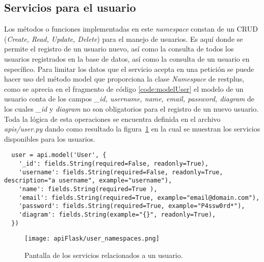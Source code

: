 \subsection{Servicios para el usuario}

Los métodos o funciones implementadas en este \textit{namespace} constan de un CRUD (\textit{Create, Read, Update, Delete}) para el manejo de usuarios. Es aquí donde se permite el registro de un usuario nuevo, así como la consulta de todos los usuarios registrados en la base de datos, así como la consulta de un usuario en específico. Para limitar los datos que el servicio acepta en una petición se puede hacer uso del método model que proporciona la clase \textit{Namespace} de restplus, como se aprecia en el fragmento de código \ref{code:modelUser} el modelo de un usuario conta de los campos \textit{\_id, username, name, email, password, diagram} de los cuales \textit{\_id} y \textit{diagram} no son obligatorios para el registro de un nuevo usuario. Toda la lógica de esta operaciones se encuentra definida en el archivo \textit{apis/user.py} dando como resultado la figura~\ref{img:userEndpoints} en la cual se muestran los servicios disponibles para los usuarios.


\begin{code}
\label{code:modelUser}
\begin{verbatim}
  user = api.model('User', {
    '_id': fields.String(required=False, readonly=True),
    'username': fields.String(required=False, readonly=True, description="a username", example="username"),
    'name': fields.String(required=True ),
    'email': fields.String(required=True, example="email@domain.com"),
    'password': fields.String(required=True, example="P4ssw0rd*"),
    'diagram': fields.String(example="{}", readonly=True),
  })

\end{verbatim}
\end{code}

\begin{figure}[H]
  \centering
  \texttt{[image: apiFlask/user\_namespaces.png]}
  \caption{Pantalla de los servicios relacionados a un usuario.}
  \label{img:userEndpoints}
\end{figure}
